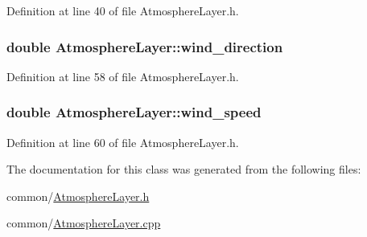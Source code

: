 Definition at line 40 of file AtmosphereLayer.h.

\hypertarget{classAtmosphereLayer_a7347b89cf89fefc3d500f6b671b2fffb}{
\subsubsection[{wind\_\-direction}]{\setlength{\rightskip}{0pt plus 5cm}double {\bf AtmosphereLayer::wind\_\-direction}}}
\label{classAtmosphereLayer_a7347b89cf89fefc3d500f6b671b2fffb}


Definition at line 58 of file AtmosphereLayer.h.

\hypertarget{classAtmosphereLayer_ae3d2eb61e1c6273cd848ef8e8129410f}{
\subsubsection[{wind\_\-speed}]{\setlength{\rightskip}{0pt plus 5cm}double {\bf AtmosphereLayer::wind\_\-speed}}}
\label{classAtmosphereLayer_ae3d2eb61e1c6273cd848ef8e8129410f}


Definition at line 60 of file AtmosphereLayer.h.



The documentation for this class was generated from the following files:\begin{DoxyCompactItemize}
\item 
common/\hyperlink{AtmosphereLayer_8h}{AtmosphereLayer.h}\item 
common/\hyperlink{AtmosphereLayer_8cpp}{AtmosphereLayer.cpp}\end{DoxyCompactItemize}
